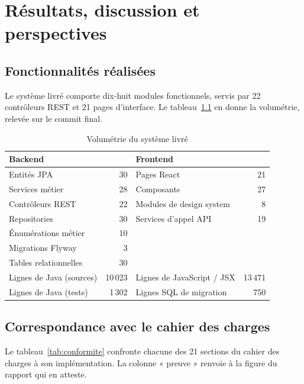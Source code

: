 \chapter{Résultats, discussion et perspectives}
\label{ch:resultats}

\section{Fonctionnalités réalisées}

Le système livré comporte dix-huit modules fonctionnels, servis par 22 contrôleurs REST et
21 pages d'interface. Le tableau~\ref{tab:volumetrie} en donne la volumétrie, relevée sur
le commit final.

\begin{table}[H]
\centering
\caption{Volumétrie du système livré}
\label{tab:volumetrie}
\small
\begin{tabularx}{\textwidth}{@{}Xr@{\hskip 2em}Xr@{}}
\toprule
\textbf{Backend} & & \textbf{Frontend} & \\
\midrule
Entités JPA & 30 & Pages React & 21 \\
Services métier & 28 & Composants & 27 \\
Contrôleurs REST & 22 & Modules de design system & 8 \\
Repositories & 30 & Services d'appel API & 19 \\
Énumérations métier & 10 & & \\
Migrations Flyway & 3 & & \\
Tables relationnelles & 30 & & \\
Lignes de Java (sources) & 10\,023 & Lignes de JavaScript / JSX & 13\,471 \\
Lignes de Java (tests) & 1\,302 & Lignes SQL de migration & 750 \\
\bottomrule
\end{tabularx}
\end{table}

\section{Correspondance avec le cahier des charges}

Le tableau~\ref{tab:conformite} confronte chacune des 21 sections du cahier des charges à
son implémentation. La colonne « preuve » renvoie à la figure du rapport qui en atteste.

